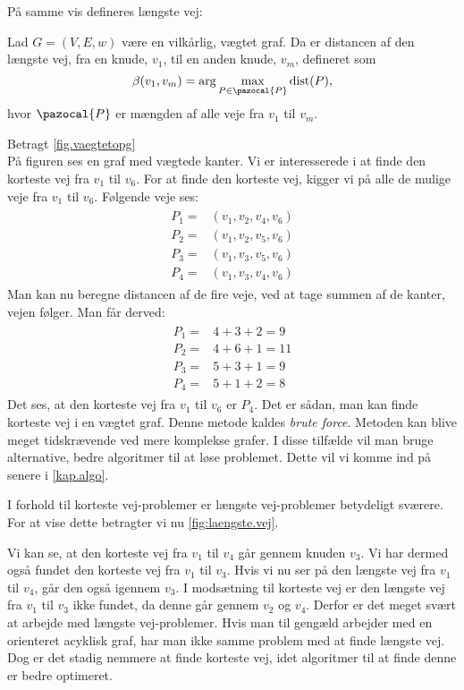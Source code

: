 På samme vis defineres længste vej:

\begin{defn} 
	Lad $G=(V,E,w)$ være en vilkårlig, vægtet graf. Da er distancen af den længste vej, fra en knude, $v_1$, til en anden knude, $v_m$, defineret som
	\begin{equation}
		\beta(v_1,v_m)=\arg \max_{P \in \pazocal{P}}
		\textrm{dist}(P),
	\end{equation}
	hvor $\pazocal{P}$ er mængden af alle veje fra $v_1$ til $v_m$.
\end{defn}

\begin{exmp}
Betragt \autoref{fig.vaegtetopg} \\

På figuren ses en graf med vægtede kanter. Vi er interesserede i at finde den korteste vej fra $v_1$ til $v_6$. For at finde den korteste vej, kigger vi på alle de mulige veje fra $v_1$ til $v_6$.
Følgende veje ses:
\begin{align}
\begin{split}
	P_1=&(v_1,v_2,v_4,v_6)\\
	P_2=&(v_1,v_2,v_5,v_6)\\
	P_3=&(v_1,v_3,v_5,v_6)\\
	P_4=&(v_1,v_3,v_4,v_6)
\end{split}
\end{align}
Man kan nu beregne distancen af de fire veje, ved at tage summen af de kanter, vejen følger. Man får derved:
\begin{align}
\begin{split}
	P_1=&4+3+2=9\\
	P_2=&4+6+1=11\\
	P_3=&5+3+1=9\\
	P_4=&5+1+2=8
\end{split}
\end{align}
Det ses, at den korteste vej fra $v_1$ til $v_6$ er $P_4$. 
Det er sådan, man kan finde korteste vej i en vægtet graf. Denne metode kaldes \emph{brute force}. Metoden kan blive meget tidskrævende ved mere komplekse grafer. I disse tilfælde vil man bruge alternative, bedre algoritmer til at løse problemet. Dette vil vi komme ind på senere i \autoref{kap.algo}.
\end{exmp}

I forhold til korteste vej-problemer er længste vej-problemer betydeligt sværere. For at vise dette betragter vi nu \autoref{fig:laengste.vej}.

Vi kan se, at den korteste vej fra $v_1$ til $v_4$ går gennem knuden $v_3$. Vi har dermed også fundet den korteste vej fra $v_1$ til $v_3$.
Hvis vi nu ser på den længste vej fra $v_1$ til $v_4$, går den også igennem $v_3$. I modsætning til korteste vej er den længste vej fra $v_1$ til $v_3$ ikke fundet, da denne går gennem $v_2$ og $v_4$. Derfor er det meget svært at arbejde med længste vej-problemer.
Hvis man til gengæld arbejder med en orienteret acyklisk graf, har man ikke samme problem med at finde længste vej. Dog er det stadig nemmere at finde korteste vej, idet algoritmer til at finde denne er bedre optimeret.
